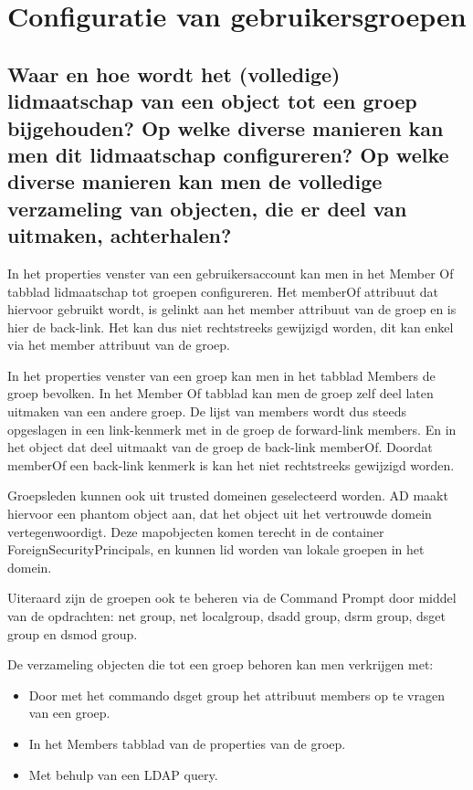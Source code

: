 \chapter{Configuratie van gebruikersgroepen}

\section{Waar en hoe wordt het (volledige) lidmaatschap van een object tot een
groep bijgehouden? Op welke diverse manieren kan men dit lidmaatschap
configureren? Op welke diverse manieren kan men de volledige verzameling van
objecten, die er deel van uitmaken, achterhalen?}

In het properties venster van een gebruikersaccount kan men in het Member Of
tabblad lidmaatschap tot groepen configureren. Het memberOf attribuut dat
hiervoor gebruikt wordt, is gelinkt aan het member attribuut van de groep en is
hier de back-link. Het kan dus niet rechtstreeks gewijzigd worden, dit kan enkel
via het member attribuut van de groep.

In het properties venster van een groep kan men in het tabblad Members de groep
bevolken. In het Member Of tabblad kan men de groep zelf deel laten uitmaken van
een andere groep. De lijst van members wordt dus steeds opgeslagen in een
link-kenmerk met in de groep de forward-link members. En in het object dat deel
uitmaakt van de groep de back-link memberOf. Doordat memberOf een back-link
kenmerk is kan het niet rechtstreeks gewijzigd worden.

Groepsleden kunnen ook uit trusted domeinen geselecteerd worden. AD maakt
hiervoor een phantom object aan, dat het object uit het vertrouwde domein
vertegenwoordigt. Deze mapobjecten komen terecht in de container
ForeignSecurityPrincipals, en kunnen lid worden van lokale groepen in het
domein.

Uiteraard zijn de groepen ook te beheren via de Command Prompt door middel van
de opdrachten: net group, net localgroup, dsadd group, dsrm group, dsget group
en dsmod group.

De verzameling objecten die tot een groep behoren kan men verkrijgen met:
\begin{itemize}
	\item Door met het commando dsget group het attribuut members op te
		vragen van een groep.
	\item In het Members tabblad van de properties van de groep.
	\item Met behulp van een LDAP query.
\end{itemize}

